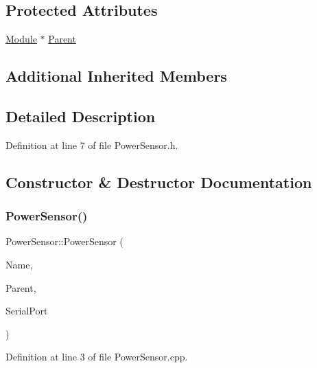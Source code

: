 \subsection*{Protected Attributes}
\begin{DoxyCompactItemize}
\item 
\hyperlink{class_module}{Module} $\ast$ \hyperlink{class_power_sensor_aec7f26ccc5882e626f4dd6fa0f4729bb}{Parent}
\end{DoxyCompactItemize}
\subsection*{Additional Inherited Members}


\subsection{Detailed Description}


Definition at line 7 of file Power\+Sensor.\+h.



\subsection{Constructor \& Destructor Documentation}
\mbox{\label{class_power_sensor_ac075e36efa8d0786590a7a2179f22520}} 
\subsubsection{\texorpdfstring{Power\+Sensor()}{PowerSensor()}\hspace{0.1cm}{\footnotesize\ttfamily [1/2]}}
{\footnotesize\ttfamily Power\+Sensor\+::\+Power\+Sensor (\begin{DoxyParamCaption}\item[{const \+\_\+\+\_\+\+Flash\+String\+Helper $\ast$}]{Name,  }\item[{\hyperlink{class_module}{Module} $\ast$}]{Parent,  }\item[{Hardware\+Serial $\ast$}]{Serial\+Port }\end{DoxyParamCaption})}



Definition at line 3 of file Power\+Sensor.\+cpp.

